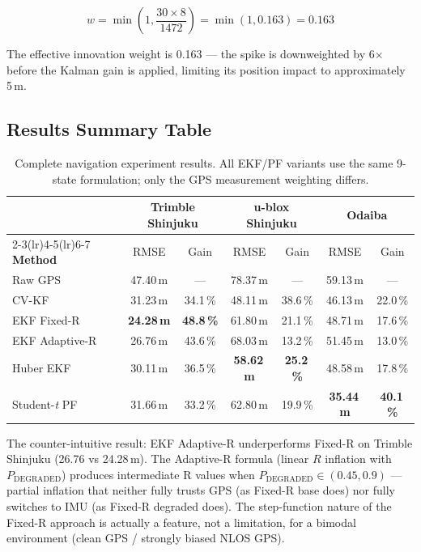 \documentclass[12pt,a4paper]{article}
\begin{document}
\begin{equation}
  w = \min\!\left(1, \frac{30 \times 8}{1472}\right) = \min(1, 0.163) = 0.163
\end{equation}

The effective innovation weight is 0.163 --- the spike is downweighted by 6$\times$ before
the Kalman gain is applied, limiting its position impact to approximately 5\,m.

\subsection{Results Summary Table}

\begin{table}[H]
  \centering
  \caption{Complete navigation experiment results.
           All EKF/PF variants use the same 9-state formulation; only the
           GPS measurement weighting differs.}
  \begin{tabular}{lcccccc}
    \toprule
    & \multicolumn{2}{c}{\textbf{Trimble Shinjuku}} &
      \multicolumn{2}{c}{\textbf{u-blox Shinjuku}} &
      \multicolumn{2}{c}{\textbf{Odaiba}} \\
    \cmidrule(lr){2-3}\cmidrule(lr){4-5}\cmidrule(lr){6-7}
    \textbf{Method} & RMSE & Gain & RMSE & Gain & RMSE & Gain \\
    \midrule
    Raw GPS         & 47.40\,m & ---       & 78.37\,m & ---       & 59.13\,m & --- \\
    CV-KF           & 31.23\,m & 34.1\,\% & 48.11\,m & 38.6\,\% & 46.13\,m & 22.0\,\%\\
    EKF Fixed-R     & \textbf{24.28\,m} & \textbf{48.8\,\%} & 61.80\,m & 21.1\,\%& 48.71\,m & 17.6\,\%\\
    EKF Adaptive-R  & 26.76\,m & 43.6\,\% & 68.03\,m & 13.2\,\% & 51.45\,m & 13.0\,\%\\
    Huber EKF       & 30.11\,m & 36.5\,\% & \textbf{58.62\,m} & \textbf{25.2\,\%}& 48.58\,m & 17.8\,\%\\
    Student-\emph{t} PF & 31.66\,m & 33.2\,\% & 62.80\,m & 19.9\,\% & \textbf{35.44\,m} & \textbf{40.1\,\%}\\
    \bottomrule
  \end{tabular}
\end{table}

The counter-intuitive result: EKF Adaptive-R underperforms Fixed-R on Trimble Shinjuku
(26.76 vs 24.28\,m).
The Adaptive-R formula (linear $R$ inflation with $P_\mathrm{DEGRADED}$) produces
intermediate R values when $P_\mathrm{DEGRADED} \in (0.45, 0.9)$ ---
partial inflation that neither fully trusts GPS (as Fixed-R base does)
nor fully switches to IMU (as Fixed-R degraded does).
The step-function nature of the Fixed-R approach is actually a feature, not a limitation,
for a bimodal environment (clean GPS / strongly biased NLOS GPS).
\end{document}
